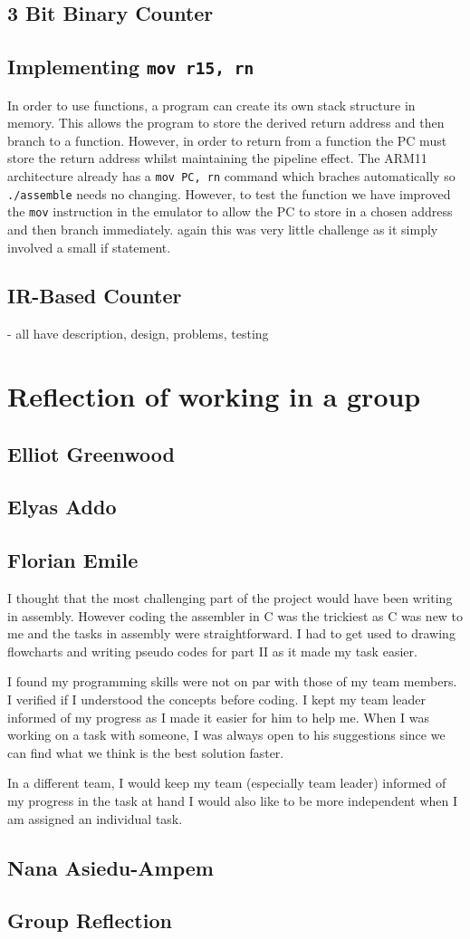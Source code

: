 \documentclass[11pt]{article}
\begin{document}
\subsection{3 Bit Binary Counter}
\subsection{Implementing \texttt{mov r15, rn}}
In order to use functions, a program can create its own stack structure in memory. This allows the program to store the derived return address and then branch to a function. However, in order to return from a function the PC must store the return address whilst maintaining the pipeline effect. The ARM11 architecture already has a \texttt{mov PC, rn} command which braches automatically so \texttt{./assemble} needs no changing. However, to test the function we have improved the \texttt{mov} instruction in the emulator to allow the PC to store in a chosen address and then branch immediately. again this was very little challenge as it simply involved a small if statement.
\subsection{IR-Based Counter}

  - all have description, design, problems, testing

\section{Reflection of working in a group}
\subsection{Elliot Greenwood}
\subsection{Elyas Addo}
\subsection{Florian Emile}

I thought that the most challenging part of the project would have been writing
in assembly. However coding the assembler in C was the trickiest as C was new to
me and the tasks in assembly were straightforward. I had to get used to drawing
flowcharts and writing pseudo codes for part II as it made my task easier.

I found my programming skills were not on par with those of my team members. I
verified if I understood the concepts before coding. I kept my team leader
informed of my progress as I made it easier for him to help me. When I was
working on a task with someone, I was always open to his suggestions since we
can find what we think is the best solution faster.

In a different team, I would keep my team (especially team leader) informed of
my progress in the task at hand I would also like to be more independent when I
am assigned an individual task.

\subsection{Nana Asiedu-Ampem}
\subsection{Group Reflection}
\end{document}

